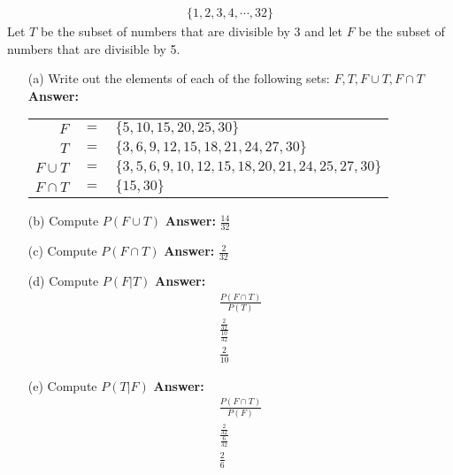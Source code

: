 \documentclass[a4paper]{article}
\begin{document}
\begin{itemize}
	\begin{equation}
        \begin{split}
            \{1, 2, 3, 4, \cdots, 32\}
        \end{split}
    \end{equation} 
    Let $T$ be the subset of numbers that are divisible by 3 and let $F$ be the subset of numbers that are divisible by 5.
    \begin{itemize}
        \item[(a)] Write out the elements of each of the following sets: $F, T, F \cup T, F \cap T$ \\
        \textbf{Answer:} 
        \begin{tabular}{rcl}
            $F$        & $=$ & $\{5, 10, 15, 20, 25, 30\}$ \\
            $T$        & $=$ & $\{3, 6, 9, 12, 15, 18, 21, 24, 27, 30\}$ \\
            $F \cup T$ & $=$ & $\{3, 5, 6, 9, 10, 12, 15, 18, 20, 21, 24, 25, 27, 30\}$ \\
            $F \cap T$ & $=$ & $\{15, 30\}$ \\
        \end{tabular}
        \item[(b)] Compute $P(F \cup T)$
        \textbf{Answer:} $\frac{14}{32}$
        \item[(c)] Compute $P(F \cap T)$
        \textbf{Answer:} $\frac{2}{32}$
        \item[(d)] Compute $P(F|T)$
        \textbf{Answer:}  
        \begin{equation}
            \begin{split}
                \frac{P(F \cap T)}{P(T)} \\
                \frac{\frac{2}{32}}{\frac{10}{32}} \\
                \frac{2}{10}
            \end{split}
        \end{equation}
        \item[(e)] Compute $P(T|F)$
        \textbf{Answer:} 
        \begin{equation}
            \begin{split}
                \frac{P(F \cap T)}{P(F)} \\
                \frac{\frac{2}{32}}{\frac{6}{32}} \\
                \frac{2}{6}
            \end{split}
        \end{equation} 

\end{itemize}
\end{itemize}
\end{document}
